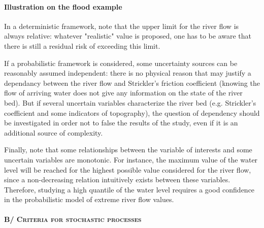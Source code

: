 \paragraph{Illustration on the flood example}
\par

In a deterministic framework, note that the upper limit for the river flow is always relative: whatever "realistic" value is proposed, one has to be aware that there is still a residual risk of exceeding this limit.

If a probabilistic framework is considered, some uncertainty sources can be reasonably assumed independent: there is no physical reason that may justify a dependancy between the river flow and Strickler's friction coefficient  (knowing the flow of arriving water does not give any information on the state of the river bed). But if several uncertain variables characterize the river bed (e.g. Strickler's coefficient and some indicators of topography), the question of dependency should be investigated in order not to false the results of the study, even if it is an additional source of complexity.

Finally, note that some relationships between the variable of interests and some uncertain variables are monotonic. For instance, the maximum value of the water level will be reached for the highest possible value considered for the river flow, since a non-decreasing relation intuitively exists between these variables. Therefore, studying a high quantile of the water level requires a good confidence in the probabilistic model of extreme river flow values.


\paragraph{\textsc{B/ Criteria for stochastic processes}}
\par

